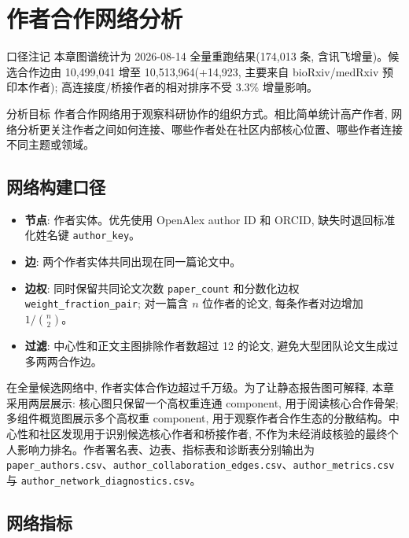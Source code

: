 \section{作者合作网络分析}

\begin{reportbox}{口径注记}
本章图谱统计为 2026-08-14 全量重跑结果(174,013 条, 含讯飞增量)。候选合作边由 10,499,041 增至 10,513,964(+14,923, 主要来自 bioRxiv/medRxiv 预印本作者); 高连接度/桥接作者的相对排序不受 3.3\% 增量影响。
\end{reportbox}

\begin{reportbox}{分析目标}
作者合作网络用于观察科研协作的组织方式。相比简单统计高产作者, 网络分析更关注作者之间如何连接、哪些作者处在社区内部核心位置、哪些作者连接不同主题或领域。
\end{reportbox}

\subsection{网络构建口径}

\begin{itemize}
  \item \textbf{节点}: 作者实体。优先使用 OpenAlex author ID 和 ORCID, 缺失时退回标准化姓名键 \texttt{author\_key}。
  \item \textbf{边}: 两个作者实体共同出现在同一篇论文中。
  \item \textbf{边权}: 同时保留共同论文次数 \texttt{paper\_count} 和分数化边权 \texttt{weight\_fraction\_pair}; 对一篇含 $n$ 位作者的论文, 每条作者对边增加 $1/\binom{n}{2}$。
  \item \textbf{过滤}: 中心性和正文主图排除作者数超过 12 的论文, 避免大型团队论文生成过多两两合作边。
\end{itemize}

在全量候选网络中, 作者实体合作边超过千万级。为了让静态报告图可解释, 本章采用两层展示: 核心图只保留一个高权重连通 component, 用于阅读核心合作骨架; 多组件概览图展示多个高权重 component, 用于观察作者合作生态的分散结构。中心性和社区发现用于识别候选核心作者和桥接作者, 不作为未经消歧核验的最终个人影响力排名。作者署名表、边表、指标表和诊断表分别输出为 \texttt{paper\_authors.csv}、\texttt{author\_collaboration\_edges.csv}、\texttt{author\_metrics.csv} 与 \texttt{author\_network\_diagnostics.csv}。

\subsection{网络指标}

